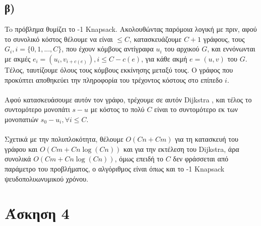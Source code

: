 \documentclass[12pt,a4paper]{article}
\begin{document}
  \subsection{β)}

    To πρόβλημα θυμίζει το {-1 Knapsack}. Ακολουθώντας παρόμοια
    λογική με πριν, αφού το συνολικό κόστος θέλουμε να είναι \(\le C\),
    κατασκευάζουμε \(C + 1\) γράφους, τους \(G_i, i = \{0, 1, ..., C\}\), που
    έχουν κόμβους αντίγραφα \(u_i\) του αρχικού \(G\), και εννόνωνται με
    ακμές \(e_i = (u_i, v_{i + c(e)}), i \le C - c(e)\),
    για κάθε ακμή \(e = (u, v)\) του \(G\). Τέλος, ταυτίζουμε όλους τους κόμβους
    εκκίνησης μεταξύ τους.
    O γράφος που προκύπτει αποθηκεύει την πληροφορία του τρέχοντος κόστους
    στο επίπεδο \(i\).
    \\
    \\
    Αφού κατασκευάσουμε αυτόν τον γράφο, τρέχουμε σε αυτόν {\latintext Dijkstra}
    , και τέλος το συντομότερο μονοπάτι \(s-u\) με κόστος το πολύ \(C\) είναι το
    συντομότερο εκ των μονοπατιών \(s_0-u_i, \forall i \le C\).
    \\
    \\
    Σχετικά με την πολυπλοκότητα, θέλουμε \( Ο(Cn + Cm) \) για τη κατασκευή
    του γράφου και \(O(Cm + Cn\log{(Cn)})\) και για την εκτέλεση του 
    {\latintext Dijkstra}, άρα συνολικά \(O(Cm + Cn\log{(Cn)})\), όμως επειδή
    το \(C\) δεν φράσσεται από παράμετρο του προβλήματος, ο αλγόριθμος είναι
    όπως και το {-1 Knapsack} ψευδοπολυωνυμικού χρόνου.

  \section{Άσκηση 4}
\end{document}
